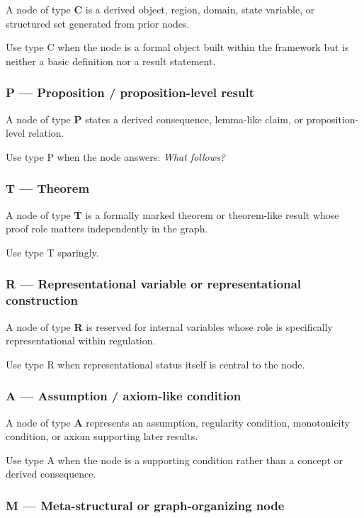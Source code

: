 \documentclass[11pt,a4paper]{article}
\begin{document}
	A node of type \textbf{C} is a derived object, region, domain, state variable, or structured set
	generated from prior nodes.
	
	Use type C when the node is a formal object built within the framework but is neither a basic
	definition nor a result statement.
	
	\subsubsection*{P --- Proposition / proposition-level result}
	
	A node of type \textbf{P} states a derived consequence, lemma-like claim, or proposition-level relation.
	
	Use type P when the node answers: \emph{What follows?}
	
	\subsubsection*{T --- Theorem}
	
	A node of type \textbf{T} is a formally marked theorem or theorem-like result whose proof role
	matters independently in the graph.
	
	Use type T sparingly.
	
	\subsubsection*{R --- Representational variable or representational construction}
	
	A node of type \textbf{R} is reserved for internal variables whose role is specifically representational
	within regulation.
	
	Use type R when representational status itself is central to the node.
	
	\subsubsection*{A --- Assumption / axiom-like condition}
	
	A node of type \textbf{A} represents an assumption, regularity condition, monotonicity condition,
	or axiom supporting later results.
	
	Use type A when the node is a supporting condition rather than a concept or derived consequence.
	
	\subsubsection*{M --- Meta-structural or graph-organizing node}
	
\end{document}
